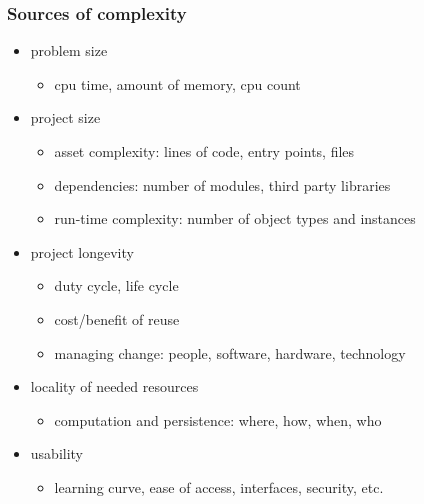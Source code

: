 %
%


\begin{frame}[fragile]
%
  \frametitle{Sources of complexity}
%
  \begin{itemize}
%
  \item problem size 
    \begin{itemize}
      \item cpu time, amount of memory, cpu count
    \end{itemize}
%
  \item project size
    \begin{itemize}
    \item asset complexity: lines of code, entry points, files
    \item dependencies: number of modules, third party libraries
    \item run-time complexity: number of object types and instances
    \end{itemize}
%
  \item project longevity
    \begin{itemize}
    \item duty cycle, life cycle
    \item cost/benefit of reuse
    \item managing change: people, software, hardware, technology
    \end{itemize}
%
  \item locality of needed resources
    \begin{itemize}
    \item computation and persistence: where, how, when, who
    \end{itemize}
%
  \item usability
    \begin{itemize}
    \item learning curve, ease of access, interfaces, security, etc.
    \end{itemize}
%
  \end{itemize}
%
\end{frame}

